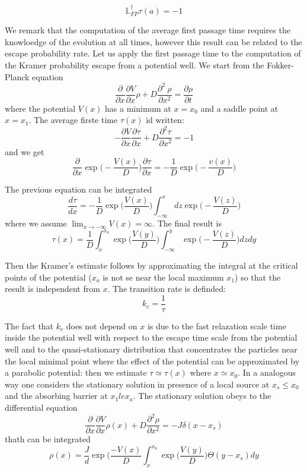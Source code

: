 \begin{equation}
\mathbb{L}_{FP}^{\dagger} \tau(a) = -1
\end{equation}

We remark that the computation of the average first passage time requires the knowloedge of the evolution at all times, however this result can be related to the escape probability rate. Let us apply the first passage time to the computation of the Kramer probability escape from a potential well.
We start from the Fokker-Planck equation 
$$
\frac{\partial}{\partial x} \frac{\partial V}{\partial x} \rho + D \frac{\partial ^2 \
\rho }{\partial x^2} = \frac{\partial 
\rho }{ \partial t}
$$
where the potential $V(x)$ has a minimum at $x = x_0$ and a saddle point at $x = x_1$.
The average firste time $\tau(x)$ id written:
$$
-\frac{\partial V}{\partial x}\frac{\partial \tau}{\partial x} + D \frac{\partial ^2 \tau}{\partial x^2} = -1
$$
and we get 
$$
\frac{\partial}{\partial x} \exp \biggl(-\frac{V(x)}{D}\biggr) \frac{\partial \tau}{\partial x} = - \frac{1}{D} \exp \biggl( - \frac{v(x)}{D}\biggr)
$$

The previous equation can be integrated
$$
\frac{d\tau}{dx} = - \frac{1}{D} \exp \biggl(\frac{V(x)}{D}\biggr) \int_{-\infty}^x dz \exp \biggl(-\frac{V(z)}{D}\biggr)
$$
where we assume $\lim_{x\to - \infty} V(x) = \infty$. The final result is 
\begin{equation}
\tau(x) = \frac{1}{D} \int_x^{x_a} \exp \biggl(\frac{V(y)}{D}\biggr) \int _{-\infty}^y \exp\biggl(-\frac{V(z)}{D}\biggr) dzdy
\end{equation}

Then the Kramer's estimate follows by approximating the integral at the critical points of the potential ($x_a$ is not se near the local maximum $x_1$) so that the result is independent from $x$. The transition rate is definded:
$$
k_c = \frac{1}{\tau}
$$

The fact that $k_c$ does not depend on $x$ is due to the fast relazation scale time inside the potential well with respect to the escape time scale from the potential well and to the quasi-stationary distribution that concentrates the particles near the local minimal point where the effect of the potential can be approximated by a parabolic potential: then we estimate $\tau \simeq \tau(x)$ where $x \simeq x_0$.
In a analogous way one considers the stationary solution in presence of a local source at $x_s \le x_0 $ and the absorbing barrier at $x_1 le x_a$. The stationary solution obeys to the differential equation 
$$
\frac{\partial}{\partial x}\frac{\partial V}{\partial x} \rho(x) + D \frac{\partial^2 \rho}{\partial x^2} = -J \delta(x-x_s)
$$ 
thath can be integrated 
$$
\rho(x) = \frac{J}{d} \exp \biggl(\frac{-V(x)}{D}\int_x^{x_a} \exp \biggl(\frac{V(y)}{D}\biggr) \Theta(y-x_s) dy
$$

